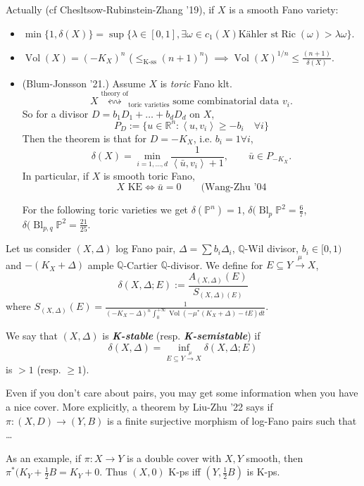 Actually (cf Chesltsow-Rubinstein-Zhang '19), if \(X\) is a smooth Fano variety:
\begin{itemize}
	\item \(\operatorname{min}\{1,\delta(X)\}=\operatorname{sup}\{\lambda \in [0,1], \exists \omega \in c_1(X)\text{Kähler st} \operatorname{Ric}(\omega) > \lambda \omega\}\).
	\item \(\operatorname{Vol}(X)=(-K_X)^n\) (\(\leq_{\text{K-ss} }(n+1)^n\)) \(\implies  \operatorname{Vol}(X)^{1/n}\leq  \frac{(n+1)}{\delta(X)}\).
	\item (Blum-Jonsson '21.) Assume \(X\) is \textit{toric} Fano klt.
		\[X \overset{\text{theory of} }{ \leftrightsquigarrow}_{\text{toric varieties} }\text{some combinatorial data \(v_i\)}. \]
		So for a divisor \(D=b_1D_1+\ldots+b_dD_d\) on \(X\),
		\[P_D:=\{u \in \mathbb{R}^n: \left<u,v_i\right>\geq -b_i \quad \forall i\}\]
	Then the theorem is that for \(D=-K_X\), i.e. \(b_i=1 \forall i\),
	\[\delta(X)=\operatorname{min}_{i=1,\ldots,d}\frac{1}{\left<\bar{u},v_i\right>+1},\qquad \bar{u} \in P_{-K_X}.\]
In particular, if \(X\) is smooth toric Fano,
\[X \text{ KE} \iff \bar{u} =0\qquad \text{(Wang-Zhu '04} \]

\begin{example}\leavevmode
	For the following toric varieties we get \(\delta(\mathbb{P}^n)=1\), \(\delta(\operatorname{Bl}_p\mathbb{P}^2=\frac{6}{7}\), \(\delta(\operatorname{Bl}_{p,q}\mathbb{P}^2=\frac{21}{25}\).
\end{example}
\end{itemize}

Let us consider \((X,\Delta)\) log Fano pair, \(\Delta=\sum b_i\Delta_i\), \(\mathbb{Q}\)-Wil divisor, \(b_i \in [0,1)\) and \(-(K_X+\Delta)\) ample \(\mathbb{Q}\)-Cartier  \(\mathbb{Q}\)-divisor. We define for \(E \subseteq Y \xrightarrow{\mu}X\),
\[\delta(X,\Delta;E):=\frac{A_{(X,\Delta)}(E)}{S_{(X,\Delta)(E)}}\]
where \(S_{(X,\Delta)}(E)=\frac{1}{(-K_X-\Delta)^n \int_0^{+\infty}\operatorname{Vol}(-\mu ^*(K_X+\Delta)-tE)dt}\).

We say that \((X,\Delta)\) is \textit{\textbf{K-stable}} (resp. \textit{\textbf{K-semistable}}) if
\[\delta(X,\Delta)=\operatorname{inf}_{E \subseteq Y \xrightarrow{\mu}X}\delta(X,\Delta;E)\]
is \(>1\) (resp. \(\geq 1\)).

\begin{remark}\leavevmode
Even if you don't care about pairs, you may get some information when you have a nice cover. More explicitly, a theorem by Liu-Zhu '22 says if \(\pi:(X,D)\to (Y,B)\) is a finite surjective morphism of log-Fano pairs such that …

As an example, if \(\pi:X \to Y\) is a double cover with \(X,Y\) smooth, then \(\pi^* (K_Y+\frac{1}{2}B=K_Y+0\). Thus \((X,0)\) K-ps iff \((Y,\frac{1}{2}B)\) is K-ps.
\end{remark}

